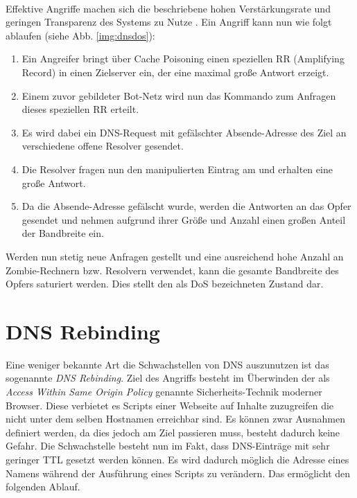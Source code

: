 \paragraph{}
Effektive Angriffe machen sich die beschriebene hohen Verstärkungsrate und geringen Transparenz des Systems zu Nutze \cite{Kambourakis2008}. Ein Angriff kann nun wie folgt ablaufen (siehe Abb. \ref{img:dnsdos}):
\begin{enumerate}[topsep=0pt,itemsep=-1ex,partopsep=1ex,parsep=1ex]
    \item Ein Angreifer bringt über Cache Poisoning einen speziellen RR (Amplifying Record) in einen Zielserver ein, der eine maximal große Antwort erzeigt.
    \item Einem zuvor gebildeter Bot-Netz wird nun das Kommando zum Anfragen dieses speziellen RR erteilt. 
    \item Es wird dabei ein DNS-Request mit gefälschter Absende-Adresse des Ziel an verschiedene offene Resolver gesendet.
    \item Die Resolver fragen nun den manipulierten Eintrag am und erhalten eine große Antwort.
    \item Da die Absende-Adresse gefälscht wurde, werden die Antworten an das Opfer gesendet und nehmen aufgrund ihrer Größe und Anzahl einen großen Anteil der Bandbreite ein. 
\end{enumerate}
Werden nun stetig neue Anfragen gestellt und eine ausreichend hohe Anzahl an Zombie-Rechnern bzw. Resolvern verwendet, kann die gesamte Bandbreite des Opfers saturiert werden. Dies stellt den als \ac{DoS} bezeichneten Zustand dar.

\section{DNS Rebinding}
\label{sec:attack-dnsrebind}
Eine weniger bekannte Art die Schwachstellen von DNS auszunutzen ist das sogenannte \textit{DNS Rebinding}. Ziel des Angriffs besteht im Überwinden der als \textit{Access Within Same Origin Policy} genannte Sicherheits-Technik moderner Browser. Diese verbietet es Scripts einer Webseite auf Inhalte zuzugreifen die nicht unter dem selben Hostnamen erreichbar sind. Es können zwar Ausnahmen definiert werden, da dies jedoch am Ziel passieren muss, besteht dadurch keine Gefahr. Die Schwachstelle besteht nun im Fakt, dass DNS-Einträge mit sehr geringer TTL gesetzt werden können. Es wird dadurch möglich die Adresse eines Namens während der Ausführung eines Scripts zu verändern\cite{Jackson2009}. Das ermöglicht den folgenden Ablauf.

